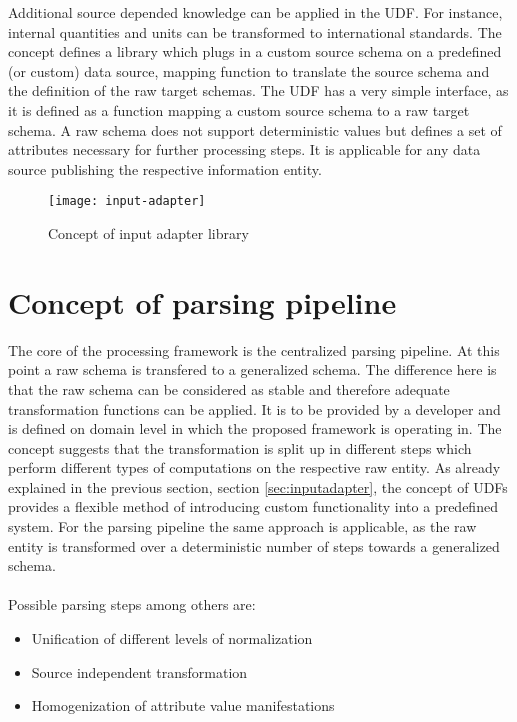 Additional source depended knowledge can be applied in the UDF. For instance, internal quantities and units can be transformed to international standards. The concept defines a library which plugs in a custom source schema on a predefined (or custom) data source, mapping function to translate the source schema and the definition of the raw target schemas. The UDF has a very simple interface, as it is defined as a function mapping a custom source schema to a raw target schema. A raw schema does not support deterministic values but defines a set of attributes necessary for further processing steps. It is applicable for any data source publishing the respective information entity.

\begin{figure}[htb]
  \centering
  \texttt{[image: input-adapter]}\\
  \caption{Concept of input adapter library}
  \label{fig:inputadapter}
\end{figure}

\section{Concept of parsing pipeline\label{sec:ppln}}

The core of the processing framework is the centralized parsing pipeline. At this point a raw schema is transfered to a generalized schema. The difference here is that the raw schema can be considered as stable and therefore adequate transformation functions can be applied. It is to be provided by a developer and is defined on domain level in which the proposed framework is operating in. The concept suggests that the transformation is split up in different steps which perform different types of computations on the respective raw entity. As already explained in the previous section, section \ref{sec:inputadapter}, the concept of UDFs provides a flexible method of introducing custom functionality into a predefined system. For the parsing pipeline the same approach is applicable, as the raw entity is transformed over a deterministic number of steps towards a generalized schema. 
\\\\
Possible parsing steps among others are:
\begin{itemize}
\item Unification of different levels of normalization
\item Source independent transformation
\item Homogenization of attribute value manifestations
\end{itemize}

